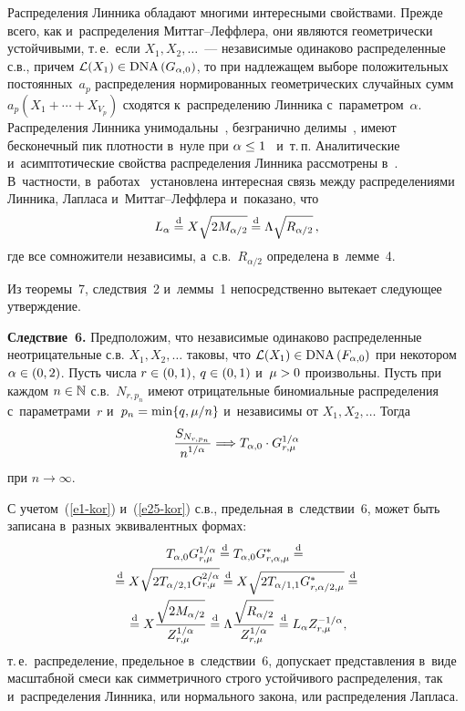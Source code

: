 \begin{multicols}{2}
Распределения Линника обладают многими интересными свойствами.
Прежде всего, как и~распределения Мит\-таг--Леф\-фле\-ра, они являются
геометри\-чески устойчивыми, т.\,е.\ если $X_1,X_2,\ldots$~--- независимые
одинаково распределенные с.в., причем $\mathcal{L}(X_1)\hm\in
\mathrm{DNA}\,(G_{\alpha,0})$, то при надлежащем выборе положительных
постоянных~$a_p$ распределения нормированных геометрических
случайных сумм $a_p(X_1+\cdots+X_{V_p})$ сходятся к~распределению
Линника с~параметром~$\alpha$. Распределения Линника унимодальны~\cite{Laha1961}, 
безгранично делимы~\cite{Devroye1990}, имеют
бесконечный пик плотности в~нуле при $\alpha\hm\le1$~\cite{Devroye1990} и~т.\,п. 
Аналитические и~асимптотические свойства
распределения Линника рассмотрены в~\cite{KorolevZeifman2016b,
KorolevZeifman2016a, KotzOstrovskiiHayfavi1995a,
KotzOstrovskiiHayfavi1995b}. В~част\-ности, 
в~работах~\cite{KorolevZeifman2016b, KotzOstrovskii1996} установлена
интересная связь между распределениями Линника, Лап\-ла\-са и~Мит\-таг--Леф\-фле\-ра и~показано, что
\begin{equation}
L_{\alpha}\stackrel{\mathrm{d}}{=} X\sqrt{2M_{\alpha/2}}\stackrel{\mathrm{d}}{=}
\Lambda\sqrt{R_{\alpha/2}}\,,\label{e25-kor}
\end{equation}
где все сомножители независимы, а~с.в.~$R_{\alpha/2}$ определена в~лемме~4.

Из теоремы~7, следствия~2 и~леммы~1 непосредственно вытекает
следующее утверждение.

\smallskip

\noindent
\textbf{Следствие~6.} Предположим, что независимые одинаково
распределенные неотрицательные с.в. $X_1,X_2,\ldots$ таковы, что
$\mathcal{L}(X_1)\hm\in \mathrm{DNA}\,(F_{\alpha,0})$ при некотором
$\alpha\hm\in(0,2)$. Пусть числа $r\hm\in(0,1)$, $q\hm\in(0,1)$ и~$\mu\hm>0$
произвольны. Пусть при каждом $n\hm\in\mathbb{N}$ с.в.~$N_{r,p_n}$
имеют отрицательные биномиальные распределения с~параметрами~$r$ 
и~$p_n\hm=\min\{q,\mu/n\}$ и~независимы от $X_1,X_2,\ldots$ Тогда
\begin{equation}
\displaystyle\frac{\displaystyle S_{N_{r,p_n}}\mathstrut}{\displaystyle n^{1/\alpha}\mathstrut}\Longrightarrow T_{\alpha,0}\cdot
G_{r,\mu}^{1/\alpha}\label{e26-kor}
\end{equation}
при $n\to\infty$.

\smallskip

С учетом~(\ref{e1-kor}) и~(\ref{e25-kor}) с.в., предельная в~следствии~6, может быть
записана в~разных эквивалентных формах:
\begin{multline*}
T_{\alpha,0} G_{r,\mu}^{1/\alpha}\stackrel{\mathrm{d}}{=} T_{\alpha,0}
G^*_{r,\alpha,\mu}\stackrel{\mathrm{d}}{=}{}\\
{}\stackrel{\mathrm{d}}{=} X 
\sqrt{2T_{\alpha/2,1}G_{r,\mu}^{2/\alpha}}\stackrel{\mathrm{d}}{=}
X \sqrt{2T_{\alpha/1,1}G^*_{r,\alpha/2,\mu}}\stackrel{\mathrm{d}}{=}{}\\
{}\stackrel{\mathrm{d}}{=}
X \displaystyle\frac{\displaystyle \sqrt{2M_{\alpha/2}}\mathstrut}{\displaystyle Z_{r,\mu}^{1/\alpha}\mathstrut}
\stackrel{\mathrm{d}}{=}\Lambda \displaystyle\frac{\displaystyle \sqrt{R_{\alpha/2}}\mathstrut}{\displaystyle Z_{r,\mu}^{1/\alpha}\mathstrut}\stackrel{\mathrm{d}}{=}
L_{\alpha} Z_{r,\mu}^{-1/\alpha},
\end{multline*}
т.\,е.\ распределение, предельное в~следствии~6, допускает
представления в~виде масштабной смеси как симметричного строго
устойчивого распределения, так и~распределения Линника, или
нормального закона, или распределения Лапласа.


\end{multicols}
